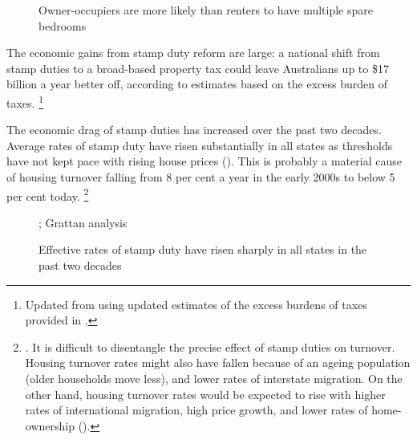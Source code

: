 \begin{figure}
\caption{Owner-occupiers are more likely than renters to have multiple spare bedrooms}\label{fig:owners-spare-bedrooms}
\end{figure}

The economic gains from stamp duty reform are large: a national shift from stamp duties to a broad-based property tax could leave Australians up to \$17 billion a year better off, according to estimates based on the excess burden of taxes.%
	\footnote{Updated from \textcite[][11]{DaleyCoates-2015-Property-taxes} using updated estimates of the excess burdens of taxes provided in \textcite{CaoHoskingKouparitsasEtAl2015}.}

The economic drag of stamp duties has increased over the past two decades.
Average rates of stamp duty have risen substantially in all states as thresholds have not kept pace with rising house prices ().
This is probably a material cause of housing turnover falling from 8 per cent a year in the early 2000s to below 5 per cent today.%
	\footnote{\textcites[][Graph~1]{RBA-Lealetal-2017-Housing-market-turnover}{Kusher-Core-Logic-2017-Dwelling-construction-surges}.
    It is difficult to disentangle the precise effect of stamp duties on turnover.
    Housing turnover rates might also have fallen because of an ageing population (older households move less), and lower rates of interstate migration.
    On the other hand, housing turnover rates would be expected to rise with higher rates of international migration, high price growth, and lower rates of home-ownership (\textcite{RBA-Lealetal-2017-Housing-market-turnover}).}

\begin{figure}
\caption{Effective rates of stamp duty have risen sharply in all states in the past two decades}\label{fig:stamp-duty-rates}
%
{\textcite{Property-Council-2016-Stamp-duty-analysis}; Grattan analysis}
\end{figure}

